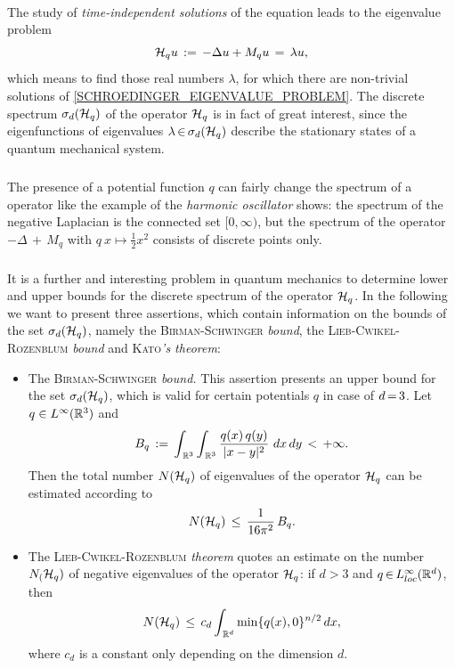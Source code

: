 \documentclass[11pt,twoside]{article}
\begin{document}
\begin{itemize}[leftmargin=9mm]
\paragraph{} %
The study of \textit{time-independent solutions}
of the {\SCHROEDINGER} equation leads to the eigenvalue problem
\begin{equation}\label{SCHROEDINGER_EIGENVALUE_PROBLEM}
{\mathcal{H}}_q u \,:=\, -\Delta u + M_q u \,=\, \lambda u,
\end{equation}
which means to find those real numbers $\lambda$,
for which there are non-trivial solutions
of \eqref{SCHROEDINGER_EIGENVALUE_PROBLEM}.
The discrete spectrum $\sigma_d({\mathcal{H}}_q)$ of the operator ${\mathcal{H}}_q$
is in fact of great interest,
since the eigen\-functions of eigen\-values $\lambda {\,\in\,} \sigma_d({\mathcal{H}}_q)$
describe the stationary states of a quantum mechanical system.

\subparagraph{} %
The presence of a potential function $q$
can fairly change the spectrum of a {\SCHROEDINGER} operator 
like the example of the \textit{harmonic oscillator} shows:
the spectrum of the negative Laplacian is the connected set $[0,\infty)$,
but the spectrum of the operator $-\Delta {\,+\,} M_q$ 
with $q \: x \mapsto \frac{1}{2}x^2$ consists of discrete points only.

\subparagraph{} %
It is a further and interesting problem in quantum mechanics
to determine lower and upper bounds for the discrete spectrum
of the operator ${\mathcal{H}}_q$.
In the following we want to present three assertions,
which contain information on the bounds of the set $\sigma_d({\mathcal{H}}_q)$,
namely
the \textsc{Birman-Schwinger} \textit{bound}, 
the \textsc{Lieb-Cwikel-Rozenblum} \textit{bound} and
    \textsc{Kato}\textit{'s theorem}:

\begin{itemize}[leftmargin=4mm]
\item[1.]
The \textsc{Birman-Schwinger} \textit{bound.}
This assertion presents an upper bound for the set $\sigma_d({\mathcal{H}}_q)$,
which is valid for certain potentials $q$ in case of $d {\,=\,} 3$.
Let $q \in L^{\infty}({\mathbb{R}}^3)$ and 
\[
B_q \eqdef
\int_{\,\R^3} \int_{\,\R^3} \frac{q(x) \, q(y)}{\abs{x-y} ^2} \ dx \, dy
\, < \, + \infty.
\]
Then the total number $N({\mathcal{H}}_q)$ of eigen\-values of the operator ${\mathcal{H}}_q$
can be estimated according to
\[
N({\mathcal{H}}_q) \, \leq \, \frac{1}{16 \pi^2} \, B_q.
\]

\item[2.]
The \textsc{Lieb-Cwikel-Rozenblum} \textit{theorem}
quotes an estimate on the number $N_({\mathcal{H}}_q)$
of negative eigen\-values of the operator ${\mathcal{H}}_q$:
if $d > 3$ and $q {\,\in\,} L_{loc}^{\infty}({\mathbb{R}}^d)$,
then
\[
N({\mathcal{H}}_q) \, \leq \, c_d \int_{\,{\mathbb{R}}^d} \min \{q(x),0\}^{n/2} \, dx,
\]
where $c_d$ is a constant only depending on the dimension $d$.


\end{itemize}
\end{itemize}
\end{document}
